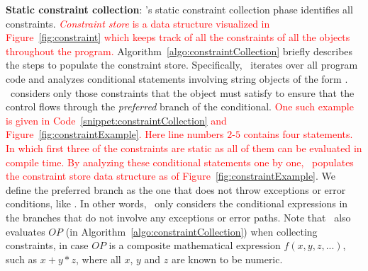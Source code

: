 \begin{mylist}

 \item \textbf{Static constraint collection}: \tool's static constraint
collection phase identifies all constraints. \textcolor{red} {\emph{Constraint
store} is a data structure visualized in Figure~\ref{fig:constraint} which
keeps track of all the constraints of all the
 objects throughout the program.}
Algorithm~\ref{algo:constraintCollection} briefly describes the steps to
populate the constraint store.
Specifically, \tool\ iterates over all program code and analyzes conditional
statements involving string objects of the form .
\tool\ considers only those constraints that the object must satisfy to ensure
that the control flows through the \textit{preferred} branch of the conditional.
\textcolor{red} {One such example is given in
Code~\ref{snippet:constraintCollection} and
Figure~\ref{fig:constraintExample}. Here line numbers $2$-$5$ contains four
 statements. In which first three of the constraints are static as
all of them can be evaluated in compile time. By analyzing these conditional
statements one by one, \tool\ populates the constraint store data structure as
of Figure~\ref{fig:constraintExample}}.
We define the preferred branch as the one that does not throw exceptions or error conditions, like . In other words, \tool\ only
considers the conditional expressions in the branches that do not involve any
exceptions or error paths. Note that \tool\ also evaluates $OP$ (in
Algorithm~\ref{algo:constraintCollection}) when collecting constraints, in case
$OP$ is a composite mathematical expression $f(x,y,z,...)$, such as $x + y * z$,
where all $x$, $y$ and $z$ are known to be numeric.

\begin{algorithm}[t]
\scriptsize
\DontPrintSemicolon
{}
\end{algorithm}
\end{mylist}
